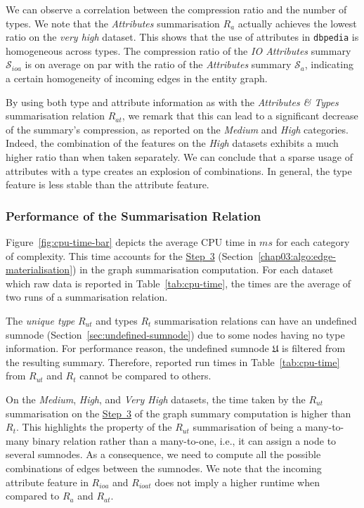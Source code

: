 We can observe a correlation between the compression ratio and the number of types.
We note that the \emph{Attributes} summarisation $R_a$ actually achieves the lowest ratio on the \emph{very high} dataset. This shows that the use of attributes in \texttt{dbpedia} is homogeneous across types. The compression ratio of the \emph{IO Attributes} summary $\mathcal{S}_{ioa}$ is on average on par with the ratio of the \emph{Attributes} summary $\mathcal{S}_a$, indicating a certain homogeneity of incoming edges in the entity graph.

By using both type and attribute information as with the \emph{Attributes \& Types} summarisation relation $R_{at}$, we remark that this can lead to a significant decrease of the summary's compression, as reported on the \emph{Medium} and \emph{High} categories.
Indeed, the combination of the features on the \emph{High} datasets exhibits a much higher ratio than when taken separately.%
We can conclude that a sparse usage of attributes with a type creates an explosion of combinations. In general, the type feature is less stable than the attribute feature.



\subsubsection{Performance of the Summarisation Relation}

Figure~\ref{fig:cpu-time-bar} depicts the average CPU time in $ms$ for each category of complexity. This time accounts for the \hyperref[step-he]{Step~3} (Section~\ref{chap03:algo:edge-materialisation}) in the graph summarisation computation.
For each dataset which raw data is reported in Table~\ref{tab:cpu-time}, the times are the average of two runs of a summarisation relation.

The \emph{unique type} $R_{ut}$ and types $R_t$ summarisation relations can have an undefined sumnode (Section~\ref{sec:undefined-sumnode}) due to some nodes having no type information. For performance reason, the undefined sumnode $\mathfrak{U}$ is filtered from the resulting summary. Therefore, reported run times in Table~\ref{tab:cpu-time} from $R_{ut}$ and $R_t$ cannot be compared to others.

On the \emph{Medium}, \emph{High}, and \emph{Very High} datasets, the time taken by the $R_{ut}$ summarisation on the \hyperref[step-he]{Step~3} of the graph summary computation is higher than $R_t$. This highlights the property of the $R_{ut}$ summarisation of being a many-to-many binary relation rather than a many-to-one, i.e., it can assign a node to several sumnodes. As a consequence, we need to compute all the possible combinations of edges between the sumnodes.
We note that the incoming attribute feature in $R_{ioa}$ and $R_{ioat}$ does not imply a higher runtime when compared to $R_{a}$ and $R_{at}$.

